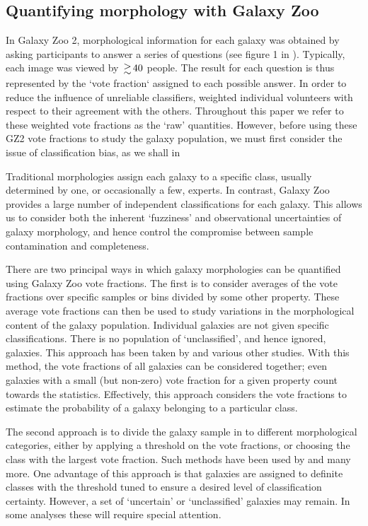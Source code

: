 \documentclass[useAMS,usenatbib]{mn2e}
\begin{document}
\subsection{Quantifying morphology with Galaxy Zoo}
\label{sec:comparison_methods}

In Galaxy Zoo 2, morphological information for each galaxy was obtained by asking participants to answer a series of questions (see figure 1 in \citealt{Willett_13}).  Typically, each image was viewed by $\ga 40$ people.  The result for each question is thus represented by the `vote fraction` assigned to each possible answer.  In order to reduce the influence of unreliable classifiers, \citet{Willett_13} weighted individual volunteers with respect to their agreement with the others.  Throughout this paper we refer to these weighted vote fractions as the `raw' quantities. However, before using these GZ2 vote fractions to study the galaxy population, we must first consider the issue of classification bias, as we shall in

Traditional morphologies assign each galaxy to a specific class, usually determined by one, or occasionally a few, experts. In contrast, Galaxy Zoo provides a large number of independent classifications for each galaxy.  This allows us to consider both the inherent `fuzziness' and observational uncertainties of galaxy morphology, and hence control the compromise between sample contamination and completeness.

There are two principal ways in which galaxy morphologies can be quantified using Galaxy Zoo vote fractions. The first is to consider averages of the vote fractions over specific samples or bins divided by some other property.  These average vote fractions can then be used to study variations in the morphological content of the galaxy population.  Individual galaxies are not given specific classifications.  There is no population of `unclassified', and hence ignored, galaxies.  This approach has been taken by \citet{Bamford_09,Casteels_13,Willett_15} and various other studies. With this method, the vote fractions of all galaxies can be considered together; even galaxies with a small (but non-zero) vote fraction for a given property count towards the statistics. Effectively, this approach considers the vote fractions to estimate the probability of a galaxy belonging to a particular class.

The second approach is to divide the galaxy sample in to different morphological categories, either by applying a threshold on the vote fractions, or choosing the class with the largest vote fraction. Such methods have been used by \citep{Land,Skibba_09,Smethurst_15} and many more.  One advantage of this approach is that galaxies are assigned to definite classes with the threshold tuned to ensure a desired level of classification certainty.  However, a set of `uncertain' or `unclassified' galaxies may remain.  In some analyses these will require special attention.
\end{document}
